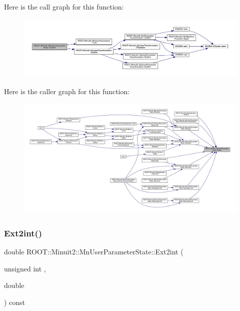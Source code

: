 Here is the call graph for this function\+:
\nopagebreak
\begin{figure}[H]
\begin{center}
\leavevmode
\includegraphics[width=350pt]{d3/de0/classROOT_1_1Minuit2_1_1MnUserParameterState_a8e0b79e3a150b2ccd15678755b1adb4a_cgraph}
\end{center}
\end{figure}
Here is the caller graph for this function\+:
\nopagebreak
\begin{figure}[H]
\begin{center}
\leavevmode
\includegraphics[width=350pt]{d3/de0/classROOT_1_1Minuit2_1_1MnUserParameterState_a8e0b79e3a150b2ccd15678755b1adb4a_icgraph}
\end{center}
\end{figure}
\mbox{\label{classROOT_1_1Minuit2_1_1MnUserParameterState_a8e0b79e3a150b2ccd15678755b1adb4a}} 
\subsubsection{\texorpdfstring{Ext2int()}{Ext2int()}\hspace{0.1cm}{\footnotesize\ttfamily [3/3]}}
{\footnotesize\ttfamily double R\+O\+O\+T\+::\+Minuit2\+::\+Mn\+User\+Parameter\+State\+::\+Ext2int (\begin{DoxyParamCaption}\item[{unsigned int}]{,  }\item[{double}]{ }\end{DoxyParamCaption}) const}

